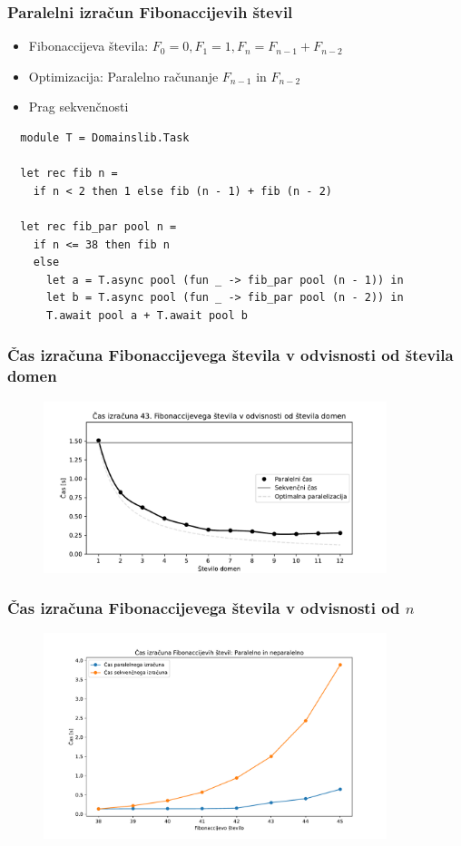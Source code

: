 \documentclass{beamer}
\begin{document}
\begin{frame}[fragile]
  \frametitle{Paralelni izračun Fibonaccijevih števil}
  \begin{itemize}
    \item Fibonaccijeva števila: $F_0 = 0, F_1 = 1, F_n = F_{n-1} + F_{n-2}$
    \item Optimizacija: Paralelno računanje $F_{n-1}$ in $F_{n-2}$
    \item Prag sekvenčnosti
  \end{itemize}
  \begin{verbatim}
  module T = Domainslib.Task

  let rec fib n = 
    if n < 2 then 1 else fib (n - 1) + fib (n - 2)
  
  let rec fib_par pool n =
    if n <= 38 then fib n
    else
      let a = T.async pool (fun _ -> fib_par pool (n - 1)) in
      let b = T.async pool (fun _ -> fib_par pool (n - 2)) in
      T.await pool a + T.await pool b
  \end{verbatim}
\end{frame}

\begin{frame}
  \frametitle{Čas izračuna Fibonaccijevega števila v odvisnosti od števila domen}
  \begin{figure}[h!]
    \centering
    \includegraphics[width=10cm]{slike/fib_par_v_odvisnosti_od_domen.pdf}
  \end{figure}
\end{frame}

\begin{frame}
  \frametitle{Čas izračuna Fibonaccijevega števila v odvisnosti od $n$}
  \begin{figure}[h!]
    \centering
    \includegraphics[width=10cm]{slike/fib_par_v_odvisnosti_od_n.pdf}
  \end{figure}
\end{frame}
\end{document}
